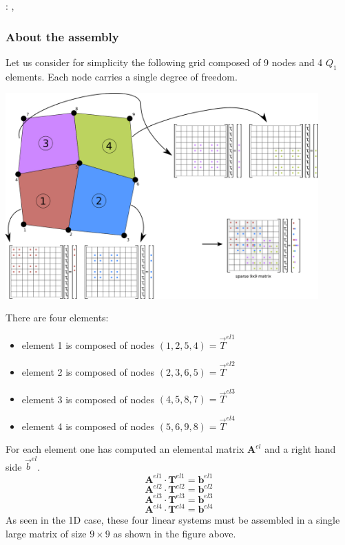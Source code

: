 \mscthesis: \cite[p121]{reddybook2}, \cite[p143]{reddybook2} 


\subsubsection{About the assembly}

Let us consider for simplicity the following grid composed of 9 nodes and 4 $Q_1$ elements. 
Each node carries a single degree of freedom. 

\begin{center}
\includegraphics[width=12cm]{images/assembly/assembly.png} 
\end{center}

There are four elements:
\begin{itemize}
\item element 1 is composed of nodes $(1,2,5,4)={\vec T}^{el1}$
\item element 2 is composed of nodes $(2,3,6,5)={\vec T}^{el2}$
\item element 3 is composed of nodes $(4,5,8,7)={\vec T}^{el3}$
\item element 4 is composed of nodes $(5,6,9,8)={\vec T}^{el4}$
\end{itemize}
For each element one has computed an elemental matrix ${\bm A}^{el}$ and a right hand side ${\vec b}^{el}$. 
\[
{\bm A}^{el1} \cdot {\bm T}^{el1} = {\bm b}^{el1}
\]
\[
{\bm A}^{el2} \cdot {\bm T}^{el2} = {\bm b}^{el2}
\]
\[
{\bm A}^{el3} \cdot {\bm T}^{el3} = {\bm b}^{el3}
\]
\[
{\bm A}^{el4} \cdot {\bm T}^{el4} = {\bm b}^{el4}
\]
As seen in the 1D case, these four linear systems must be assembled in a single large matrix of size 
$9\times 9$ as shown in the figure above.

